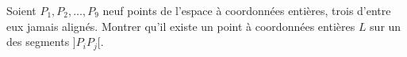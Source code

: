 Soient $P_1, P_2, \ldots, P_9$ neuf points de l'espace à coordonnées entières, trois d'entre eux jamais alignés. Montrer qu'il existe un point à coordonnées entières $L$ sur un des segments $]P_iP_j[$.
